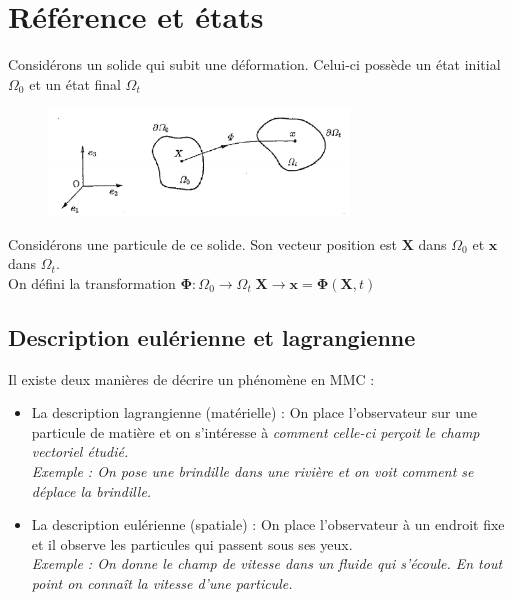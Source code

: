 \section{Référence et états}
Considérons un solide qui subit une déformation. Celui-ci possède un état initial $\Omega_0$ et un état final $\Omega_t$ 

\begin{figure}[H]
    \centering
    \includegraphics[width = 8cm]{Images/Cinematique/Etats1.png}
    \label{fig:my_label}
\end{figure}
Considérons une particule de ce solide. Son vecteur position est $\mathbf{X}$ dans $\Omega_0$ et $\mathbf{x}$ dans $\Omega_t$.\\
On défini la transformation $\mathbf{\Phi} : \Omega_0 \rightarrow \Omega_t \; \mathbf{X} \rightarrow \mathbf{x} = \mathbf{\Phi}(\textbf{X},t)$

\subsection{Description eulérienne et lagrangienne}

Il existe deux manières de décrire un phénomène en MMC : \\
\begin{itemize}
    \item La description lagrangienne (matérielle) : On place l'observateur sur une particule de matière et on s'intéresse à \textit{comment celle-ci perçoit le champ vectoriel étudié.}\\

    \textit{Exemple : On pose une brindille dans une rivière et on voit comment se déplace la brindille.}\\
    
    \item La description eulérienne (spatiale) : On place l'observateur à un endroit fixe et il observe les particules qui passent sous ses yeux.\\
    
    \textit{Exemple : On donne le champ de vitesse dans un fluide qui s'écoule. En tout point on connaît la vitesse d'une particule.}
\end{itemize}

